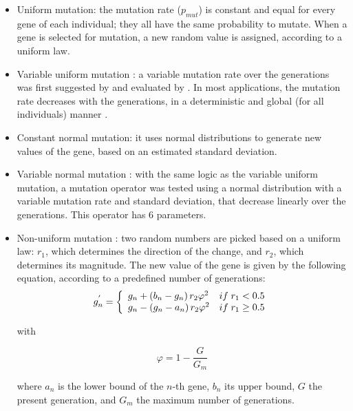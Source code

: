 \documentclass{ametsoc}
\begin{document}
\begin{itemize}
	\item Uniform mutation: the mutation rate ($p_{mut}$) is constant and equal for every gene of each individual; they all have the same probability to mutate. When a gene is selected for mutation, a new random value is assigned, according to a uniform law.
	
	\item Variable uniform mutation \citep{Fogarty1989}: a variable mutation rate over the generations was first suggested by \citet{Holland1992b} and evaluated by \citet{Fogarty1989}. In most applications, the mutation rate decreases with the generations, in a deterministic and global (for all individuals) manner \citep{Back1992b}. 
	
	\item Constant normal mutation: it uses normal distributions to generate new values of the gene, based on an estimated standard deviation.
	
	\item Variable normal mutation \citep{Horton2012a}: with the same logic as the variable uniform mutation, a mutation operator was tested using a normal distribution with a variable mutation rate and standard deviation, that decrease linearly over the generations. This operator has 6 parameters.
	
	\item Non-uniform mutation \citep{Michalewicz1996}: two random numbers are picked based on a uniform law: $r_{1}$, which determines the direction of the change, and $r_{2}$, which determines its magnitude. The new value of the gene is given by the following equation, according to a predefined number of generations:
	\begin{equation}
	g_{n}^{'} = 
	\left\lbrace \begin{array}{l l} 
	g_{n} + \left(b_{n}-g_{n}\right) r_{2} \varphi^{2} & if \; r_{1} < 0.5 \\
	g_{n} - \left(g_{n}-a_{n}\right) r_{2} \varphi^{2} & if \; r_{1} \geq 0.5 \\
	\end{array} \right.
	\label{eq:nonuniform_mutation}
	\end{equation}
	
	with 
	
	\begin{equation}
	\varphi = 1 - \dfrac{G}{G_{m}}
	\end{equation}
	
	where $a_{n}$ is the lower bound of the $n$-th gene, $b_{n}$ its upper bound, $G$ the present generation, and $G_{m}$ the maximum number of generations.
	

\end{itemize}
\end{document}
